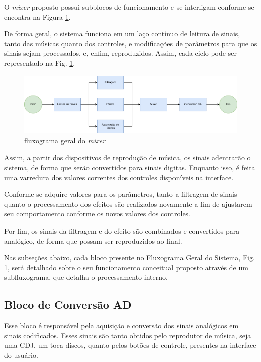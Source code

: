 O \textit{mixer} proposto possui subblocos de funcionamento e se interligam conforme se encontra na Figura \ref{fig52}.

De forma geral, o sistema funciona em um laço contínuo de leitura de sinais, tanto das músicas quanto dos controles, e modificações de parâmetros para que os sinais sejam processados, e, enfim, reproduzidos. Assim, cada ciclo pode ser representado na Fig. \ref{fig52}.

\begin{figure}[h]
    \centering
    \includegraphics[width=\textwidth]{figuras/fig52.png}
    \caption{fluxograma geral do \textit{mixer}}
    \label{fig52}
\end{figure}

Assim, a partir dos dispositivos de reprodução de música, os sinais adentrarão o sistema, de forma que serão convertidos para sinais digitas. Enquanto isso, é feita uma varredura dos valores correntes dos controles disponíveis na interface.

Conforme se adquire valores para os parâmetros, tanto a filtragem de sinais quanto o processamento dos efeitos são realizados novamente a fim de ajustarem seu comportamento conforme os novos valores dos controles.


Por fim, os sinais da filtragem e do efeito são combinados e convertidos para analógico, de forma que possam ser reproduzidos ao final.

Nas subseções abaixo, cada bloco presente no Fluxograma Geral do Sistema, Fig. \ref{fig52}, será detalhado sobre o seu funcionamento conceitual proposto através de um subfluxograma, que detalha o processamento interno.

\subsection{Bloco de Conversão AD}
Esse bloco é responsável pela aquisição e conversão dos sinais analógicos em sinais codificados. Esses sinais são tanto obtidos pelo reprodutor de música, seja uma CDJ, um toca-discos, quanto pelos botões de controle, presentes na interface do usuário.

